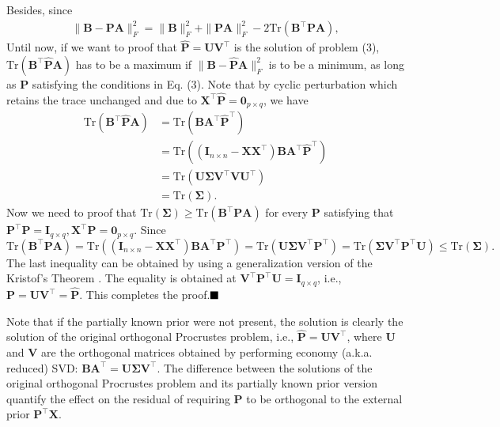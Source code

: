 \documentclass[titlepage,11pt,twoside]{article}
\begin{document}
Besides, since
\begin{equation}
\begin{split}
\|\mathbf{B}-\mathbf{P}\mathbf{A}\|_{F}^{2}
=\|\mathbf{B}\|_{F}^{2}+\|\mathbf{P}\mathbf{A}\|_{F}^{2}-2\text{Tr}(\mathbf{B}^{\top}\mathbf{P}\mathbf{A}),
\end{split}
\end{equation}
Until now, if we want to proof that $\mathbf{\hat{P}}=\mathbf{U}\mathbf{V}^{\top}$ is the solution of problem (3), $\text{Tr}(\mathbf{B}^{\top}\mathbf{\hat{P}}\mathbf{A})$ has to be a maximum if $\|\mathbf{B}-\mathbf{\hat{P}}\mathbf{A}\|_{F}^{2}$ is to be a minimum, as long as $\mathbf{P}$ satisfying the conditions in Eq. (3).
Note that by cyclic perturbation which retains the trace unchanged and due to $\mathbf{X}^{\top}\mathbf{\hat{P}}=\mathbf{0}_{p\times q}$, we have 
\begin{equation}
\begin{split}
\text{Tr}(\mathbf{B}^{\top}\mathbf{\hat{P}}\mathbf{A})
&
=
\text{Tr}(\mathbf{B}\mathbf{A}^{\top}\mathbf{\hat{P}}^{\top})
\\
&
=
\text{Tr}((\mathbf{I}_{n\times n}-\mathbf{X}\mathbf{X}^{\top})\mathbf{B}\mathbf{A}^{\top}\mathbf{\hat{P}}^{\top})
\\
&
=
\text{Tr}(\mathbf{U}\mathbf{\Sigma}\mathbf{V}^{\top}\mathbf{V}\mathbf{U}^{\top})
\\
&
=
\text{Tr}(\mathbf{\Sigma}).
\end{split}
\end{equation}
Now we need to proof that $\text{Tr}(\mathbf{\Sigma})\ge\text{Tr}(\mathbf{B}^{\top}\mathbf{P}\mathbf{A})$ for every $\mathbf{P}$ satisfying that $\mathbf{P}^{\top}\mathbf{P} = \mathbf{I}_{q\times q}, \mathbf{X}^{\top}\mathbf{P} = \mathbf{0}_{p\times q}$. 
Since $\text{Tr}(\mathbf{B}^{\top}\mathbf{P}\mathbf{A})
=
\text{Tr}((\mathbf{I}_{n\times n}-\mathbf{X}\mathbf{X}^{\top})\mathbf{B}\mathbf{A}^{\top}\mathbf{P}^{\top})
=
\text{Tr}(\mathbf{U}\mathbf{\Sigma}\mathbf{V}^{\top}\mathbf{P}^{\top})
=
\text{Tr}(\mathbf{\Sigma}\mathbf{V}^{\top}\mathbf{P}^{\top}\mathbf{U})
\le
\text{Tr}(\mathbf{\Sigma})
.
$
The last inequality can be obtained by using a generalization version \cite{TenBerge1983} of the Kristof's Theorem \cite{Kristof1970515}. The equality is obtained at 
$\mathbf{V}^{\top}\mathbf{P}^{\top}\mathbf{U}=\mathbf{I}_{q\times q}$, i.e., $\mathbf{P}=\mathbf{U}\mathbf{V}^{\top}=\mathbf{\hat{P}}$. This completes the proof.$\hfill\blacksquare$ 

Note that if the partially known prior were not present, the solution is clearly the solution of the original orthogonal Procrustes problem, i.e., $\mathbf{\hat{P}} = \mathbf{U}\mathbf{V}^{\top}$, where $\mathbf{U}$ and $\mathbf{V}$ are the orthogonal matrices obtained by performing economy (a.k.a. reduced) SVD:
$\mathbf{B}\mathbf{A}^{\top} = \mathbf{U}\mathbf{\mathbf{\Sigma}}\mathbf{V}^{\top}$. 
The difference between the solutions of the original orthogonal Procrustes problem and its partially known prior version quantify the effect on the residual of requiring $\mathbf{P}$ to be orthogonal to the external prior $\mathbf{P}^{\top}\mathbf{X}$.
\end{document}
